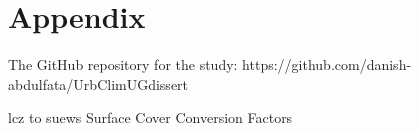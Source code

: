 \section*{\normalfont\bfseries\LARGE{{Appendix}}}

The GitHub repository for the study: https://github.com/danish-abdulfata/UrbClimUGdissert

\Gls{lcz} to \Gls{suews} Surface Cover Conversion Factors





